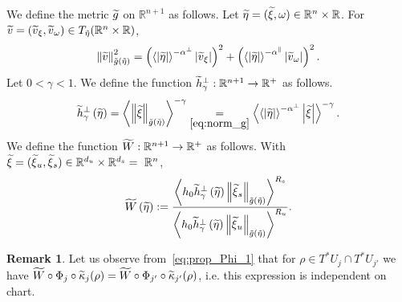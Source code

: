 \documentclass[10pt]{amsart}
\theoremstyle{definition}\newtheorem{defi}[theo]{Definition}\newtheorem{rema}[theo]{Remark}\newtheorem{exam}[theo]{Example}\newtheorem{exem}[theo]{Example}\newtheorem{nota}[theo]{Notation}
\newcommand{\bbR}{\mathbb{R}}
\let\oldtilde\tilde
\renewcommand*{\tilde}[1]{\mathchoice{\widetilde{#1}}{\widetilde{#1}}{\oldtilde{#1}}{\oldtilde{#1}}}
\begin{document}

We define the metric $\tilde{g}$ on $\bbR^{n+1}$ as follows. Let $\tilde{\eta}=(\tilde{\xi},\omega)\in\bbR^{n}\times\bbR$. For $\tilde{v}=(\tilde{v}_{\xi},\tilde{v}_{\omega})\in T_{\tilde{\eta}}(\bbR^{n}\times\bbR)$,
\begin{equation}\label{eq:norm_g}
\left\Vert \tilde{v}\right\Vert _{\tilde{g}\left(\tilde{\eta}\right)}^{2}=\left(\left\langle \left|\tilde{\eta}\right|\right\rangle ^{-\alpha^{\perp}}\left|\tilde{v}_{\xi}\right|\right)^{2}+\left(\left\langle \left|\tilde{\eta}\right|\right\rangle ^{-\alpha^{\parallel}}\left|\tilde{v}_{\omega}\right|\right)^{2}.
\end{equation}
Let $0<\gamma<1$. We define the function $\tilde{h}_{\gamma}^{\perp}:\bbR^{n+1}\rightarrow\bbR^{+}$ as follows.
\begin{equation}\label{eq:h_tilde}
\tilde{h}_{\gamma}^{\perp}\left(\tilde{\eta}\right)=\left\langle \left\Vert \tilde{\xi}\right\Vert _{\tilde{g}\left(\tilde{\eta}\right)}\right\rangle ^{-\gamma}\underset{\eqref{eq:norm_g}}{=}\left\langle \left\langle \left|\tilde{\eta}\right|\right\rangle ^{-\alpha^{\perp}}\left|\tilde{\xi}\right|\right\rangle ^{-\gamma}.
\end{equation}
We define the function $\tilde{W}:\bbR^{n+1}\rightarrow\bbR^{+}$ as follows. With $\tilde{\xi}=(\tilde{\xi}{}_{u},\tilde{\xi}{}_{s})\in\bbR^{d_{u}}\times\bbR^{d_{s}}=~\bbR^{n}$,
\begin{equation}\label{eq:def_W_tilde}
\tilde{W}\left(\tilde{\eta}\right):=\frac{\left\langle h_{0}\tilde{h}_{\gamma}^{\perp}\left(\tilde{\eta}\right)\left\Vert \tilde{\xi}{}_{s}\right\Vert _{\tilde{g}\left(\tilde{\eta}\right)}\right\rangle ^{R_{s}}}{\left\langle h_{0}\tilde{h}_{\gamma}^{\perp}\left(\tilde{\eta}\right)\left\Vert \tilde{\xi}{}_{u}\right\Vert _{\tilde{g}\left(\tilde{\eta}\right)}\right\rangle ^{R_{u}}}.
\end{equation}

\begin{rema}
Let us observe from~\eqref{eq:prop_Phi_1} that for $\rho\in T^{*}U_{j}\cap T^{*}U_{j'}$ we have $\tilde{W}\circ\Phi_{j}\circ\tilde{\kappa}_{j}(\rho)=\tilde{W}\circ\Phi_{j'}\circ\tilde{\kappa}_{j'}(\rho)$, i.e. this expression is independent on chart.
\end{rema}
\end{document}
